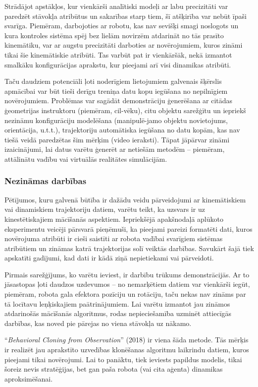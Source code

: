 \documentclass[12pt, a4paper]{article}
\numberwithin{equation}{section} %
\begin{document}
Strādājot apstākļos, kur vienkārši analītiski modeļi ar labu precizitāti var paredzēt stāvokļa atribūtus un sakarības starp tiem, šī atšķirība var nebūt īpaši svarīga. Piemēram, darbojoties ar robotu, kas nav sevišķi smagi noslogots un kura kontroles sistēma spēj bez lielām novirzēm atdarināt no tās prasīto kinemātiku, var ar augstu precizitāti darboties ar novērojumiem, kuros zināmi tikai šie kinemātiskie atribūti. Tas varbūt pat ir vienkāršāk, nekā izmantot smalkāku konfigurācijas aprakstu, kur pieejami arī visi dinamikas atribūti. 

Taču daudziem potenciāli ļoti noderīgiem lietojumiem galvenais šķērslis apmācībai var būt tieši derīgu treniņa datu kopu iegūšana no nepilnīgiem novērojumiem. Problēmas var sagādāt demonstrāciju ģenerēšana ar citādas ģeometrijas instruktoru (piemēram, cil-vēku), citu objektu sarežģītu un iepriekš nezināmu konfigurāciju modelēšana (manipulē-jamo objektu novietojums, orientācija, u.t.t.), trajektoriju automātiska iegūšana no datu kopām, kas nav tiešā veidā paredzētas šim mērķim (video ieraksti). Tāpat jāpārvar zināmi izaicinājumi, lai datus varētu ģenerēt ar netiešām metodēm -- piemēram, attālinātu vadību vai virtuālās realitātes simulācijām.

\subsubsection{Nezināmas darbības}

Pētījumos, kuru galvenā būtība ir dažādu veidu pārveidojumi ar kinemātiskiem vai dinamiskiem trajektoriju datiem, varētu teikt, ka uzsvars ir uz kinestētiskajiem mācīšanās aspektiem. Iepriekšējā apakšnodaļā aplūkoto eksperimentu veicēji pārsvarā pieņēmuši, ka pieejami pareizi formatēti dati, kuros novērojuma atribūti ir cieši saistīti ar robota vadībai svarīgiem sistēmas atribūtiem un zināmas katrā trajektorijas solī veiktās darbības. Savukārt šajā tiek apskatīti gadījumi, kad dati ir kādā ziņā nepietiekami vai pārveidoti.

Pirmais sarežģījums, ko varētu ieviest, ir darbību trūkums demonstrācijās. Ar to jāsastopas ļoti daudzos uzdevumos -- no nemarķētiem datiem var vienkārši iegūt, piemēram, robota gala efektora pozīciju un rotāciju, taču nekas nav zināms par tā locītavu leņķiskajiem paātrinājumiem. Lai varētu izmantot jau zināmos atdarinošās mācīšanās algoritmus, rodas nepieciešamība uzminēt attiecīgās darbības, kas noved pie pārejas no viena stāvokļa uz nākamo.

``\textit{Behavioral Cloning from Observation}'' \cite{torabi2018behavioral} (2018) ir viena šāda metode. Tās mērķis ir realizēt jau aprakstīto uzvedības klonēšanas algoritmu laikrindu datiem, kuros pieejami tikai novērojumi. Lai to panāktu, tiek ieviests papildus modelis, tikai šoreiz nevis stratēģijas, bet gan paša robota (vai cita aģenta) dinamikas aproksimēšanai.
\end{document}
